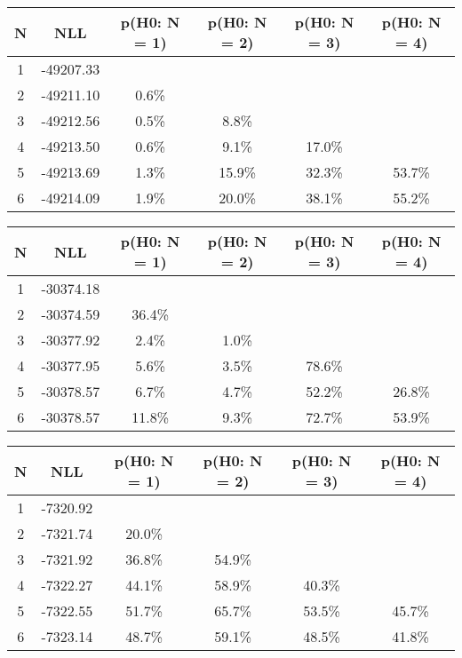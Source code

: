 \begin{table}[htb]
	\begin{center}
{\footnotesize\renewcommand{\arraystretch}{1.4}
		\begin{tabular}{cc||cccc}
			N & NLL & p(H0: N = 1) & p(H0: N = 2) & p(H0: N = 3) & p(H0: N = 4)\\ 
		\hline
1 & -49207.33 & & & & \\
2 & -49211.10 & 0.6\% & & & \\
3 & -49212.56 & 0.5\% & 8.8\% & & \\
4 & -49213.50 & 0.6\% & 9.1\% & 17.0\% & \\
5 & -49213.69 & 1.3\% & 15.9\% & 32.3\% & 53.7\% \\
6 & -49214.09 & 1.9\% & 20.0\% & 38.1\% & 55.2\% \\
	\end{tabular}
		\label{tab:lab}
	}
	\end{center}\end{table}

\begin{table}[htb]
	\begin{center}
{\footnotesize\renewcommand{\arraystretch}{1.4}
		\begin{tabular}{cc||cccc}
			N & NLL & p(H0: N = 1) & p(H0: N = 2) & p(H0: N = 3) & p(H0: N = 4)\\ 
		\hline
1 & -30374.18 & & & & \\
2 & -30374.59 & 36.4\% & & & \\
3 & -30377.92 & 2.4\% & 1.0\% & & \\
4 & -30377.95 & 5.6\% & 3.5\% & 78.6\% & \\
5 & -30378.57 & 6.7\% & 4.7\% & 52.2\% & 26.8\% \\
6 & -30378.57 & 11.8\% & 9.3\% & 72.7\% & 53.9\% \\
	\end{tabular}
		\label{tab:lab}
	}
	\end{center}\end{table}

\begin{table}[htb]
	\begin{center}
{\footnotesize\renewcommand{\arraystretch}{1.4}
		\begin{tabular}{cc||cccc}
			N & NLL & p(H0: N = 1) & p(H0: N = 2) & p(H0: N = 3) & p(H0: N = 4)\\ 
		\hline
1 & -7320.92 & & & & \\
2 & -7321.74 & 20.0\% & & & \\
3 & -7321.92 & 36.8\% & 54.9\% & & \\
4 & -7322.27 & 44.1\% & 58.9\% & 40.3\% & \\
5 & -7322.55 & 51.7\% & 65.7\% & 53.5\% & 45.7\% \\
6 & -7323.14 & 48.7\% & 59.1\% & 48.5\% & 41.8\% \\
	\end{tabular}
		\label{tab:lab}
	}
	\end{center}\end{table}

